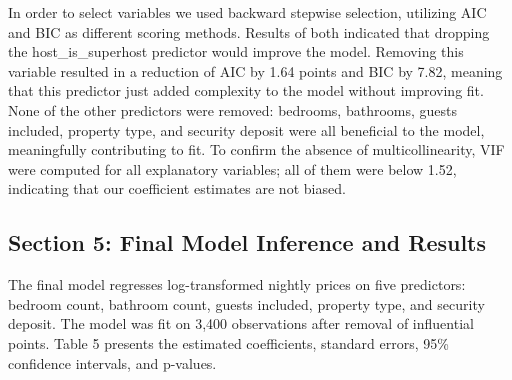 \documentclass[
]{article}
\begin{document}
In order to select variables we used backward stepwise selection,
utilizing AIC and BIC as different scoring methods. Results of both
indicated that dropping the host\_is\_superhost predictor would improve
the model. Removing this variable resulted in a reduction of AIC by 1.64
points and BIC by 7.82, meaning that this predictor just added
complexity to the model without improving fit. None of the other
predictors were removed: bedrooms, bathrooms, guests included, property
type, and security deposit were all beneficial to the model,
meaningfully contributing to fit. To confirm the absence of
multicollinearity, VIF were computed for all explanatory variables; all
of them were below 1.52, indicating that our coefficient estimates are
not biased.

\subsection{Section 5: Final Model Inference and
Results}\label{section-5-final-model-inference-and-results}

The final model regresses log-transformed nightly prices on five
predictors: bedroom count, bathroom count, guests included, property
type, and security deposit. The model was fit on 3,400 observations
after removal of influential points. Table 5 presents the estimated
coefficients, standard errors, 95\% confidence intervals, and p-values.
\end{document}

